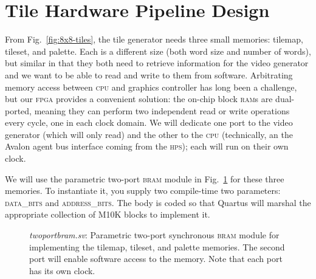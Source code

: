 \documentclass[11pt]{article}
\newcommand{\figref}[1]{Fig.~\ref{fig:#1}}
\begin{document}
\section{Tile Hardware Pipeline Design}

From \figref{8x8-tiles}, the tile generator needs three small
memories: tilemap, tileset, and palette.  Each is a different size
(both word size and number of words), but similar in that they both
need to retrieve information for the video generator and we want to be
able to read and write to them from software.  Arbitrating memory
access between \textsc{cpu} and graphics controller has long been a
challenge, but our \textsc{fpga} provides a convenient solution: the
on-chip block \textsc{ram}s are dual-ported, meaning they can perform
two independent read or write operations every cycle, one in each
clock domain. We will dedicate one port to the video generator (which
will only read) and the other to the \textsc{cpu} (technically, an the
Avalon agent bus interface coming from the \textsc{hps}); each will
run on their own clock.

We will use the parametric two-port \textsc{bram} module in
\figref{twoportbram} for these three memories.  To instantiate it, you
supply two compile-time two parameters: \textsc{data\_bits} and
\textsc{address\_bits}.  The body is coded so that Quartus will
marshal the appropriate collection of M10K blocks to implement it.

\begin{figure}
  
  \caption{\emph{twoportbram.sv}: Parametric two-port synchronous
    \textsc{bram} module for implementing the tilemap, tileset, and
    palette memories.  The second port will enable software access to
    the memory.  Note that each port has its own clock.}
  \label{fig:twoportbram}
\end{figure}
\end{document}
